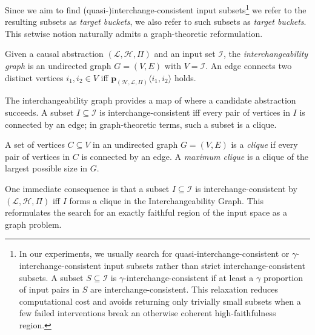Since we aim to find (quasi-)interchange-consistent input subsets\footnote{In our experiments, we usually search for quasi-interchange-consistent or \(\gamma\)-interchange-consistent input subsets rather than strict interchange-consistent subsets. A subset \(S\subseteq\mathcal I\) is \(\gamma\)-interchange-consistent if at least a \(\gamma\) proportion of input pairs in \(S\) are interchange-consistent. This relaxation reduces computational cost and avoids returning only trivially small subsets when a few failed interventions break an otherwise coherent high-faithfulness region.} we refer to the resulting subsets as \emph{target buckets}, we also refer to such subsets as \emph{target buckets}. This setwise notion naturally admits a graph-theoretic reformulation.

\begin{definition}
\label{def:interchangeability-graph}
Given a causal abstraction \((\mathcal L,\mathcal H,\Pi)\) and an input set \(\mathcal I\), the \emph{interchangeability graph} is an undirected graph \(G=(V,E)\) with \(V=\mathcal I\). An edge connects two distinct vertices \(i_1,i_2\in V\) iff \(\mathbf p_{(\mathcal H,\mathcal L,\Pi)}\langle i_1,i_2\rangle\) holds.
\end{definition}

The interchangeability graph provides a map of where a candidate abstraction succeeds. A subset \(I\subseteq \mathcal I\) is interchange-consistent iff every pair of vertices in \(I\) is connected by an edge; in graph-theoretic terms, such a subset is a clique.

\begin{definition}
\label{def:clique}
A set of vertices \(C\subseteq V\) in an undirected graph \(G=(V,E)\) is a \emph{clique} if every pair of vertices in \(C\) is connected by an edge. A \emph{maximum clique} is a clique of the largest possible size in \(G\).
\end{definition}

One immediate consequence is that a subset \(I\subseteq \mathcal I\) is interchange-consistent by \((\mathcal L,\mathcal H,\Pi)\) iff \(I\) forms a clique in the Interchangeability Graph. This reformulates the search for an exactly faithful region of the input space as a graph problem. 


